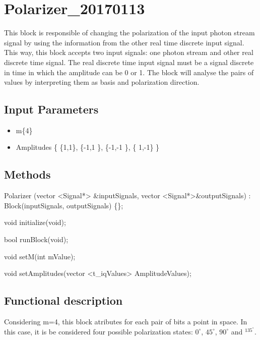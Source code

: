 \clearpage

\section{Polarizer\_20170113}

\maketitle
This block is responsible of changing the polarization of the input photon stream signal by using the information from the other real time discrete input signal. This way, this block accepts two input signals: one photon stream and other real discrete time signal. The real discrete time input signal must be a signal discrete in time in which the amplitude can be 0 or 1. The block will analyse the pairs of values by interpreting them as basis and polarization direction.


\subsection*{Input Parameters}

	\begin{itemize}
		\item m\{4\}
		\item Amplitudes \{ \{1,1\}, \{-1,1 \}, \{-1,-1 \}, \{ 1,-1\} \}
	\end{itemize}

\subsection*{Methods}

Polarizer (vector <Signal*> \&inputSignals, vector <Signal*>\&outputSignals) : Block(inputSignals, outputSignals) \{\};

void initialize(void);

bool runBlock(void);

void setM(int mValue);

void setAmplitudes(vector <t\_iqValues> AmplitudeValues);


\subsection*{Functional description}
Considering m=4, this block atributes for each pair of bits a point in space. In this case, it is be considered four possible polarization states: $0^\circ$, $45^\circ$, $90^\circ$ and $^135^\circ$.


